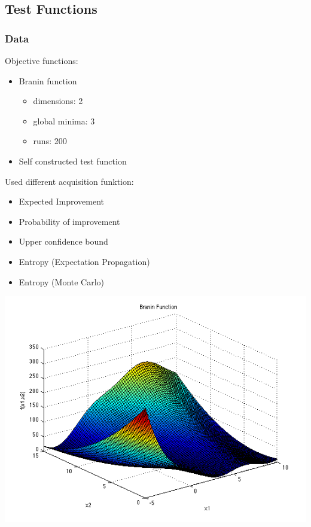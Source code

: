 \documentclass[10pt,handout]{beamer}
\begin{document}




\subsection{Test Functions}
\begin{frame}
\frametitle{Data}
\begin{minipage}{0.55\textwidth}
Objective functions:
\begin{itemize}
\item Branin function
\begin{itemize}
\item dimensions: 2
\item global minima: 3
\item runs: 200
\end{itemize}
\item Self constructed test function
\end{itemize}
Used different acquisition funktion:
\begin{itemize}
\item Expected Improvement
\item Probability of improvement
\item Upper confidence bound
\item Entropy (Expectation Propagation)
\item Entropy (Monte Carlo)
\end{itemize}
\end{minipage}
\begin{minipage}[t]{0.43\textwidth}
\includegraphics[width=\textwidth]{branin.png}
\end{minipage}
\end{frame}
\end{document}

